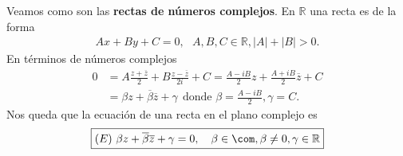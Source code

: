 Veamos como son las \textbf{rectas de números complejos}. En $\mathbb{R}$ una recta es de la forma
\begin{align*}
    Ax + By + C = 0, \ \ \ A,B,C \in \mathbb{R}, |A| + |B| > 0.
\end{align*}
En términos de números complejos
\begin{align*}
    0 &= A \frac{z + \overline{z}}{2} + B \frac{z - \overline{z}}{2i} + C = \frac{A - iB}{2}z + \frac{A +iB}{2}\overline{z} + C \\
    &= \beta z + \overline{\beta}\overline{z} + \gamma \ \ \text{donde } \beta = \frac{A - iB}{2}, \gamma = C.
\end{align*}
Nos queda que la ecuación de una recta en el plano complejo es
\begin{align*}
\boxed{
    (E) \ \beta z + \overline{\beta}\overline{z} + \gamma = 0, \ \ \ \beta \in \com, \beta \not = 0, \gamma \in \mathbb{R}
    }
\end{align*}

